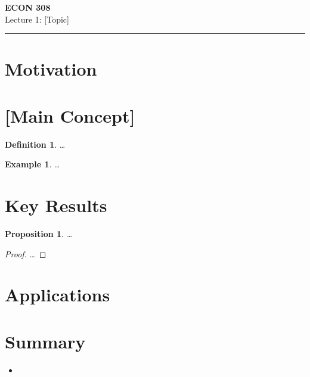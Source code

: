 \documentclass[11pt]{article}
\newtheorem{proposition}[theorem]{Proposition}
\theoremstyle{definition}
\newtheorem{definition}[theorem]{Definition}
\newtheorem{example}[theorem]{Example}
\theoremstyle{remark}
\begin{document}
\begin{center}
  {\LARGE\bfseries ECON 308}\\[0.4em]
  {\large Lecture 1: [Topic]}
\end{center}
\medskip\hrule\medskip

\section{Motivation}

\section{[Main Concept]}

\begin{definition}
  \ldots
\end{definition}

\begin{example}
  \ldots
\end{example}

\section{Key Results}

\begin{proposition}
  \ldots
\end{proposition}

\begin{proof}
  \ldots
\end{proof}

\section{Applications}

\section{Summary}

\begin{itemize}
  \item
\end{itemize}
\end{document}
